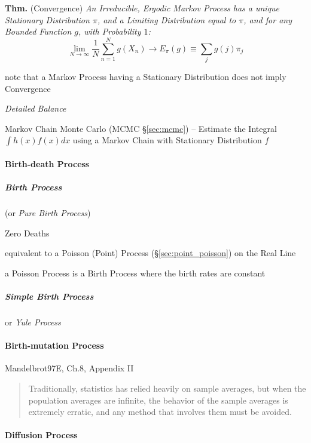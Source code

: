 \textbf{Thm.} (Convergence) \emph{
  An Irreducible, Ergodic Markov Process has a
  unique Stationary Distribution $\pi$, and a Limiting Distribution equal to
  $\pi$, and for any Bounded Function $g$, with Probability $1$:
\[
  \lim_{N\to\infty} \frac{1}{N} \sum_{n=1}^N g(X_n) \to E_\pi(g)
    \equiv \sum_j g(j) \pi_j
\]
}

note that a Markov Process having a Stationary Distribution does not imply
Convergence

\emph{Detailed Balance}

\fist Markov Chain Monte Carlo (MCMC \S\ref{sec:mcmc}) -- Estimate the Integral
$\int h(x) f(x) dx$ using a Markov Chain with Stationary Distribution $f$



\paragraph{Birth-death Process}\label{sec:birth_death}\hfill

\subparagraph{Birth Process}\label{sec:birth_process}\hfill

(or \emph{Pure Birth Process})

Zero Deaths

equivalent to a Poisson (Point) Process (\S\ref{sec:point_poisson}) on the Real
Line

a Poisson Process is a Birth Process where the birth rates are constant



\subparagraph{Simple Birth Process}\label{sec:simple_birth_process}\hfill

or \emph{Yule Process}



\paragraph{Birth-mutation Process}\label{sec:birth_mutation}\hfill

Mandelbrot97E, Ch.8, Appendix II

\begin{quote}
  Traditionally, statistics has relied heavily on sample averages, but when the
  population averages are infinite, the behavior of the sample averages is
  extremely erratic, and any method that involves them must be avoided.
\end{quote}



\paragraph{Diffusion Process}\label{sec:diffusion_process}\hfill

